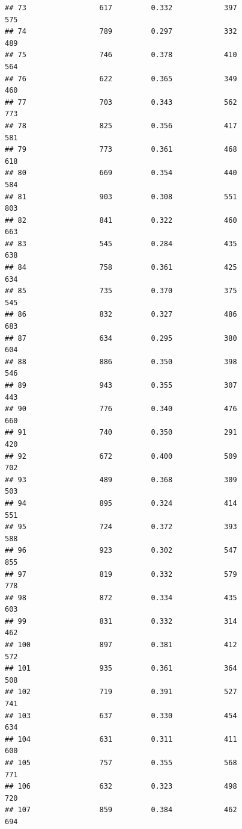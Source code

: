 \documentclass[]{book}
\begin{document}
\begin{verbatim}
## 73                 617         0.332            397                 575
## 74                 789         0.297            332                 489
## 75                 746         0.378            410                 564
## 76                 622         0.365            349                 460
## 77                 703         0.343            562                 773
## 78                 825         0.356            417                 581
## 79                 773         0.361            468                 618
## 80                 669         0.354            440                 584
## 81                 903         0.308            551                 803
## 82                 841         0.322            460                 663
## 83                 545         0.284            435                 638
## 84                 758         0.361            425                 634
## 85                 735         0.370            375                 545
## 86                 832         0.327            486                 683
## 87                 634         0.295            380                 604
## 88                 886         0.350            398                 546
## 89                 943         0.355            307                 443
## 90                 776         0.340            476                 660
## 91                 740         0.350            291                 420
## 92                 672         0.400            509                 702
## 93                 489         0.368            309                 503
## 94                 895         0.324            414                 551
## 95                 724         0.372            393                 588
## 96                 923         0.302            547                 855
## 97                 819         0.332            579                 778
## 98                 872         0.334            435                 603
## 99                 831         0.332            314                 462
## 100                897         0.381            412                 572
## 101                935         0.361            364                 508
## 102                719         0.391            527                 741
## 103                637         0.330            454                 634
## 104                631         0.311            411                 600
## 105                757         0.355            568                 771
## 106                632         0.323            498                 720
## 107                859         0.384            462                 694

\end{verbatim}
\end{document}
